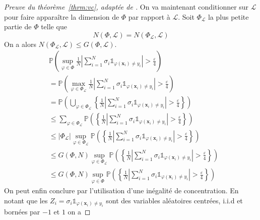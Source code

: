 \begin{proof}[Preuve du théorème~\ref{thrm:vc}, adaptée de \citet{Devroye1997}]
    On va maintenant conditionner sur $\mathcal{L}$ pour faire apparaître la dimension de $\Phi$ par rapport à $\mathcal{L}$. Soit $\Phi_{\mathcal{L}}$ la plus petite partie de $\Phi$ telle que
    \begin{equation*}
        N(\Phi,\mathcal{L}) = N(\Phi_{\mathcal{L}},\mathcal{L})
    \end{equation*}
    On a alors $N(\Phi_{\mathcal{L}},\mathcal{L}) \leq G(\Phi,\mathcal{L})$.
    \begin{align*}
        &\mathbb{P} \left( \sup_{\varphi \in \Phi} \frac{1}{N} \left\vert \sum_{i=1}^N \sigma_i \mathds{1}_{\varphi (\mathbf{x}_i) \neq y_i } \right\vert > \frac{\varepsilon}{4} \right) \\
        &= \mathbb{P} \left( \max_{\varphi \in \Phi_{\mathcal{L}}} \frac{1}{N} \left\vert \sum_{i=1}^N \sigma_i \mathds{1}_{\varphi (\mathbf{x}_i) \neq y_i } \right\vert > \frac{\varepsilon}{4} \right) \\
        &= \mathbb{P} \left( \bigcup_{\varphi \in \Phi_{\mathcal{L}}} \left\{ \frac{1}{N} \left\vert \sum_{i=1}^N \sigma_i \mathds{1}_{\varphi (\mathbf{x}_i) \neq y_i } \right\vert > \frac{\varepsilon}{4} \right\} \right) \\
        &\leq \sum_{\varphi \in \Phi_{\mathcal{L}}} \mathbb{P} \left( \left\{ \frac{1}{N} \left\vert \sum_{i=1}^N \sigma_i \mathds{1}_{\varphi (\mathbf{x}_i) \neq y_i } \right\vert > \frac{\varepsilon}{4} \right\} \right) \\
        &\leq \vert \Phi_{\mathcal{L}} \vert \sup_{\varphi \in \Phi_{\mathcal{L}}} \mathbb{P} \left( \left\{ \frac{1}{N} \left\vert \sum_{i=1}^N \sigma_i \mathds{1}_{\varphi (\mathbf{x}_i) \neq y_i } \right\vert > \frac{\varepsilon}{4} \right\} \right) \\
        &\leq G(\Phi,N) \sup_{\varphi \in \Phi_{\mathcal{L}}} \mathbb{P} \left( \left\{ \frac{1}{N} \left\vert \sum_{i=1}^N \sigma_i \mathds{1}_{\varphi (\mathbf{x}_i) \neq y_i } \right\vert > \frac{\varepsilon}{4} \right\} \right) \\
        &\leq G(\Phi,N) \sup_{\varphi \in \Phi} \mathbb{P} \left( \left\{ \frac{1}{N} \left\vert \sum_{i=1}^N \sigma_i \mathds{1}_{\varphi (\mathbf{x}_i) \neq y_i } \right\vert > \frac{\varepsilon}{4} \right\} \right)
    \end{align*}
    On peut enfin conclure par l'utilisation d'une inégalité de concentration. En notant que les $Z_i = \sigma_i \mathds{1}_{\varphi (\mathbf{x}_i) \neq y_i }$ sont des variables aléatoires centrées, i.i.d et bornées par $-1$ et $1$ on a

\end{proof}
